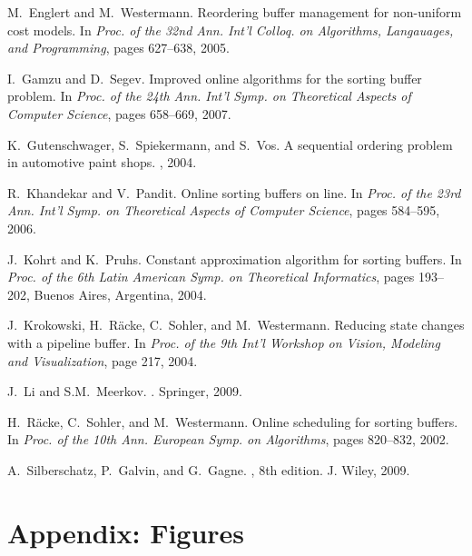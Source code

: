 \documentclass[11pt]{article}
\begin{document}
\begin{thebibliography}{10}
M.~Englert and M.~Westermann.
\newblock Reordering buffer management for non-uniform cost models.
\newblock In {\em Proc. of the 32nd Ann. Int'l Colloq. on
  Algorithms, Langauages, and Programming}, pages 627--638, 2005.

I.~Gamzu and D.~Segev.
\newblock Improved online algorithms for the sorting buffer problem.
\newblock In {\em Proc. of the 24th Ann. Int'l Symp. on Theoretical
  Aspects of Computer Science}, pages 658--669, 2007.

K.~Gutenschwager, S.~Spiekermann, and S.~Vos.
\newblock A sequential ordering problem in automotive paint shops.
,
  2004.

R.~Khandekar and V.~Pandit.
\newblock Online sorting buffers on line.
\newblock In {\em Proc. of the 23rd Ann. Int'l Symp. on Theoretical
  Aspects of Computer Science}, pages 584--595, 2006.

J.~Kohrt and K.~Pruhs.
\newblock Constant approximation algorithm for sorting buffers.
\newblock In {\em Proc. of the 6th Latin American Symp. on Theoretical
  Informatics}, pages 193--202, Buenos Aires, Argentina, 2004.

J.~Krokowski, H.~R{\"a}cke, C.~Sohler, and M.~Westermann.
\newblock Reducing state changes with a pipeline buffer.
\newblock In {\em Proc. of the 9th Int'l Workshop on Vision, Modeling and Visualization},
  page 217, 2004.

J.~Li and S.M.~Meerkov.
.
\newblock Springer, 2009.

H.~R\"{a}cke, C.~Sohler, and M.~Westermann.
\newblock Online scheduling for sorting buffers.
\newblock In {\em Proc. of the 10th Ann. European Symp. on Algorithms},
  pages 820--832, 2002.

A.~Silberschatz, P.~Galvin, and G.~Gagne.
, 8th edition.
\newblock J. Wiley, 2009.

\end{thebibliography}

\bigskip\bigskip\bigskip

\appendix

\section*{Appendix: Figures}
\end{document}
